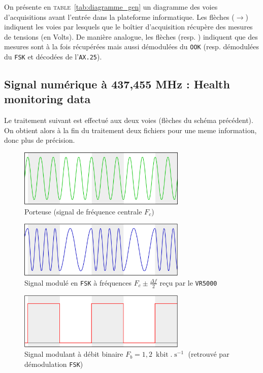\documentclass[twocolumn,pre,floats,aps,amsmath,amssymb]{revtex4}
\newenvironment{remark}[1][Remarque.]{\begin{trivlist}
\item[\hskip \labelsep {\bfseries #1}]}{\end{trivlist}}
\begin{document}
\begin{remark}
  On pr\'esente en \textsc{table}~\ref{tab:diagramme_gen} un diagramme des voies d'acquisitions avant l'entr\'ee dans la plateforme informatique. Les fl\`eches { \color{oneblue}{bleues} } ($\rightarrow$) indiquent les voies par lesquels que le bo\^itier d'acquisition r\'ecup\`ere des mesures de tensions (en Volts). De mani\`ere analogue, les fl\`eches { \color{rltgreen}{vertes} } (resp. { \color{rltred}{rouges} }) indiquent que des mesures sont \`a la fois r\'ecup\'er\'ees mais aussi d\'emodul\'ees du \texttt{OOK} (resp. d\'emodul\'ees du \texttt{FSK} et d\'ecod\'ees de l'\texttt{AX.25}).
\end{remark}

\subsection{Signal num\'erique \`a 437,455 MHz : Health monitoring data}

Le traitement suivant est effectu\'e aux deux voies (fl\`eches { \color{rltred}{rouges} } du sch\'ema pr\'ec\'edent). On obtient alors \`a la fin du traitement deux fichiers pour une meme information, donc plus de pr\'ecision.

\begin{figure}[h]
  \includegraphics[width=8cm]{pictures/porteuse.png}
  \caption{Porteuse (signal de fr\'equence centrale $F_c$)}
  \label{fig:signal_porteur}
\end{figure}

\begin{figure}[h]
  \includegraphics[width=8cm]{pictures/signal_mod.png}
  \caption{Signal modul\'e en \texttt{FSK} \`a fr\'equences $F_c \pm \frac{\Delta f}{2}$ re\c{c}u  par le \texttt{VR5000}}
  \label{fig:signal_module}
\end{figure}

\begin{figure}[h]
  \includegraphics[width=8cm]{pictures/signal_demod.png}
  \caption{Signal modulant \`a d\'ebit binaire $F_b = 1,2 \ \operatorname{kbit}.\operatorname{s}^{-1}$ (retrouv\'e par d\'emodulation \texttt{FSK})}
  \label{fig:signal_modulant}
\end{figure}
\end{document}
